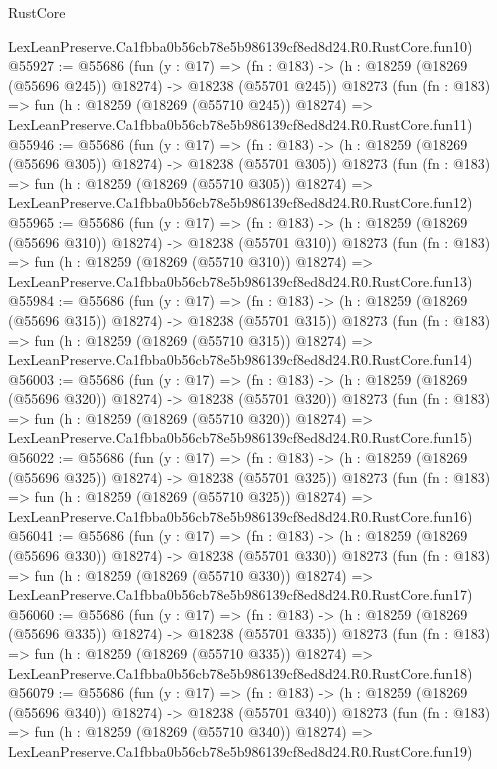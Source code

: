 \begin{lexlean}{RustCore}
\begin{coremodule}
    LexLeanPreserve.Ca1fbba0b56cb78e5b986139cf8ed8d24.R0.RustCore.fun10)
@55927 := @55686
    (fun (y : @17) =>
    (fn : @183) -> (h : @18259 (@18269 (@55696 @245)) @18274) -> @18238 (@55701 @245))
    @18273
    (fun (fn : @183) =>
    fun (h : @18259 (@18269 (@55710 @245)) @18274) =>
    LexLeanPreserve.Ca1fbba0b56cb78e5b986139cf8ed8d24.R0.RustCore.fun11)
@55946 := @55686
    (fun (y : @17) =>
    (fn : @183) -> (h : @18259 (@18269 (@55696 @305)) @18274) -> @18238 (@55701 @305))
    @18273
    (fun (fn : @183) =>
    fun (h : @18259 (@18269 (@55710 @305)) @18274) =>
    LexLeanPreserve.Ca1fbba0b56cb78e5b986139cf8ed8d24.R0.RustCore.fun12)
@55965 := @55686
    (fun (y : @17) =>
    (fn : @183) -> (h : @18259 (@18269 (@55696 @310)) @18274) -> @18238 (@55701 @310))
    @18273
    (fun (fn : @183) =>
    fun (h : @18259 (@18269 (@55710 @310)) @18274) =>
    LexLeanPreserve.Ca1fbba0b56cb78e5b986139cf8ed8d24.R0.RustCore.fun13)
@55984 := @55686
    (fun (y : @17) =>
    (fn : @183) -> (h : @18259 (@18269 (@55696 @315)) @18274) -> @18238 (@55701 @315))
    @18273
    (fun (fn : @183) =>
    fun (h : @18259 (@18269 (@55710 @315)) @18274) =>
    LexLeanPreserve.Ca1fbba0b56cb78e5b986139cf8ed8d24.R0.RustCore.fun14)
@56003 := @55686
    (fun (y : @17) =>
    (fn : @183) -> (h : @18259 (@18269 (@55696 @320)) @18274) -> @18238 (@55701 @320))
    @18273
    (fun (fn : @183) =>
    fun (h : @18259 (@18269 (@55710 @320)) @18274) =>
    LexLeanPreserve.Ca1fbba0b56cb78e5b986139cf8ed8d24.R0.RustCore.fun15)
@56022 := @55686
    (fun (y : @17) =>
    (fn : @183) -> (h : @18259 (@18269 (@55696 @325)) @18274) -> @18238 (@55701 @325))
    @18273
    (fun (fn : @183) =>
    fun (h : @18259 (@18269 (@55710 @325)) @18274) =>
    LexLeanPreserve.Ca1fbba0b56cb78e5b986139cf8ed8d24.R0.RustCore.fun16)
@56041 := @55686
    (fun (y : @17) =>
    (fn : @183) -> (h : @18259 (@18269 (@55696 @330)) @18274) -> @18238 (@55701 @330))
    @18273
    (fun (fn : @183) =>
    fun (h : @18259 (@18269 (@55710 @330)) @18274) =>
    LexLeanPreserve.Ca1fbba0b56cb78e5b986139cf8ed8d24.R0.RustCore.fun17)
@56060 := @55686
    (fun (y : @17) =>
    (fn : @183) -> (h : @18259 (@18269 (@55696 @335)) @18274) -> @18238 (@55701 @335))
    @18273
    (fun (fn : @183) =>
    fun (h : @18259 (@18269 (@55710 @335)) @18274) =>
    LexLeanPreserve.Ca1fbba0b56cb78e5b986139cf8ed8d24.R0.RustCore.fun18)
@56079 := @55686
    (fun (y : @17) =>
    (fn : @183) -> (h : @18259 (@18269 (@55696 @340)) @18274) -> @18238 (@55701 @340))
    @18273
    (fun (fn : @183) =>
    fun (h : @18259 (@18269 (@55710 @340)) @18274) =>
    LexLeanPreserve.Ca1fbba0b56cb78e5b986139cf8ed8d24.R0.RustCore.fun19)

\end{coremodule}
\end{lexlean}
